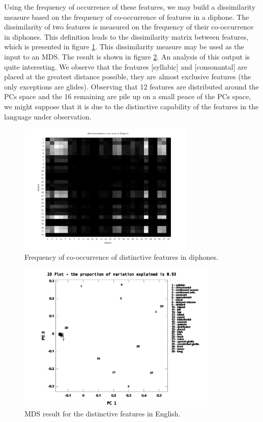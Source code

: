 Using the frequency of occurrence of these features, we may build a dissimilarity measure based on the frequency of co-occurrence of features in a diphone. The dissimilarity of two features is measured on the frequency of their co-occurrence in diphones. This definition leads to the dissimilarity matrix between features, which is presented in figure \ref{fig:distinctiveFeaturesCooccurrenceFreq}. This dissimilarity measure may be used as the input to an MDS. The result is shown in figure \ref{fig:distinctiveFeaturesMDS}. An analysis of this output is quite interesting. We observe that the features [syllabic] and [consonantal] are placed at the greatest distance possible, they are almost exclusive features (the only exceptions are glides). Observing that 12 features are distributed around the PCs space and the 16 remaining are pile up on a small peace of the PCs space, we might suppose that it is due to the distinctive capability of the features in the language under observation.

\begin{figure}[h!]
\centering
\includegraphics[width=0.75\textwidth]{images/distinctiveFeaturesCooccurrenceFreq.png}
\caption{Frequency of co-occurrence of distinctive features in diphones.}
\label{fig:distinctiveFeaturesCooccurrenceFreq}
\end{figure}



\begin{figure}[h!]
\centering
\includegraphics[width=0.85\textwidth]{images/distinctiveFeaturesMDS.pdf}
\caption{MDS result for the distinctive features in English.}
\label{fig:distinctiveFeaturesMDS}
\end{figure}


